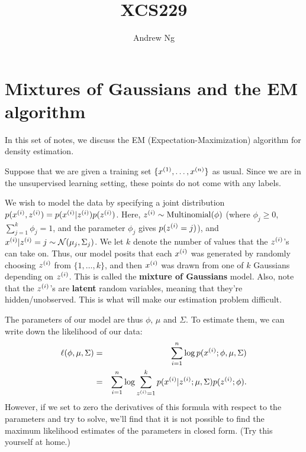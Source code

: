 \documentclass{article}
\begin{document}
\title{XCS229}
\author{Andrew Ng}
\date{}
\maketitle




\section*{Mixtures of Gaussians and the EM algorithm}

In this set of notes, we discuss the EM (Expectation-Maximization) algorithm
for density estimation.

Suppose that we are given a training set $\{x^{(1)}, \ldots, x^{({n})}\}$
as usual.  Since we are in the unsupervised learning setting, these
points do not come with any labels.

We wish to model the data by specifying a joint
distribution $p({x^{(i)}}, {z^{(i)}}) = p({x^{(i)}}|{z^{(i)}}) p({z^{(i)}})$.
Here, ${z^{(i)}} \sim {\rm Multinomial}(\phi)$ (where $\phi_j \geq 0$, $\sum_{j=1}^k \phi_j=1$,
and the parameter $\phi_j$ gives $p({z^{(i)}} = j)$),
and ${x^{(i)}} | {z^{(i)}}=j \sim {\cal N}(\mu_j, \Sigma_j)$.  We let $k$ denote the
number of values that the ${z^{(i)}}$'s can take on.  Thus, our model posits
that each ${x^{(i)}}$ was generated by randomly choosing ${z^{(i)}}$ from
$\{1, \ldots, k\}$, and then ${x^{(i)}}$ was drawn from one of $k$ Gaussians
depending on ${z^{(i)}}$.
This is called the {\bf mixture of Gaussians} model.
Also, note that the ${z^{(i)}}$'s are {\bf latent} random variables,
meaning that they're hidden/unobserved.  This is what will make our
estimation problem difficult.

The parameters of our model are thus $\phi$, $\mu$ and $\Sigma$.  To
estimate them, we can write down the likelihood of our data:
\begin{eqnarray*}
\ell(\phi, \mu, \Sigma) &=& \sum_{i=1}^{n} \log p({x^{(i)}}; \phi, \mu, \Sigma) \\
&=& \sum_{i=1}^{n} \log \sum_{{z^{(i)}}=1}^k p({x^{(i)}}| {z^{(i)}}; \mu, \Sigma) p({z^{(i)}};\phi).
\end{eqnarray*}
However, if we set to zero the derivatives of this formula with respect to the
parameters and try to solve, we'll find that it is not
possible to find the maximum likelihood estimates of the parameters
in closed form.  (Try this yourself at home.)
\end{document}
